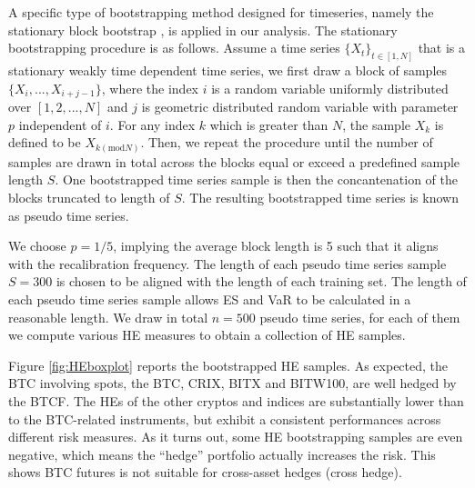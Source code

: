 A specific type of bootstrapping method designed for timeseries, namely the stationary block bootstrap \cite{Politis1994}, is applied in our analysis.
The stationary bootstrapping procedure is as follows. 
Assume a time series $\{X_t\}_{t \in [1,N]}$ that is
a stationary weakly time dependent time series,
 we first draw a block of samples $\{X_i, ..., X_{i+j-1}\}$, where the index $i$ is a
random variable uniformly distributed over 
$[1,2,...,N]$ and $j$ is geometric distributed random variable with
parameter $p$ independent of $i$. 
For any index $k$ which is greater than $N$, the sample $X_k$ is
defined to be $X_{k(\mathrm{mod} N)}$. 
Then, we repeat the procedure until the number of samples are drawn in total across the blocks equal or exceed a predefined sample length $S$. 
One bootstrapped time series sample is then the concantenation of the blocks truncated to length of $S$.
The resulting bootstrapped time series is known as pseudo time series. 

We choose $p=1/5$, implying the average block length is 5 such that it aligns with the recalibration frequency. 
The length of each pseudo time series sample $S = 300$ is chosen to be aligned with the length of each training set.  
The length of each pseudo time series sample allows ES and VaR to be calculated in a reasonable length.
We draw in total $n=500$ pseudo time series,
for each of them we compute various HE measures to obtain a collection of HE samples. 




Figure \ref{fig:HEboxplot} reports the bootstrapped HE samples.
As expected, the BTC involving spots, the BTC, CRIX, BITX and BITW100, are well hedged
by the BTCF. 
The HEs of the other cryptos and indices are
substantially lower than to the BTC-related instruments, but 
exhibit a consistent performances across different risk measures. 
As it turns out, some HE bootstrapping samples are even negative,
which means the ``hedge'' portfolio actually increases the risk. 
This shows BTC futures is not suitable for cross-asset hedges (cross hedge).

